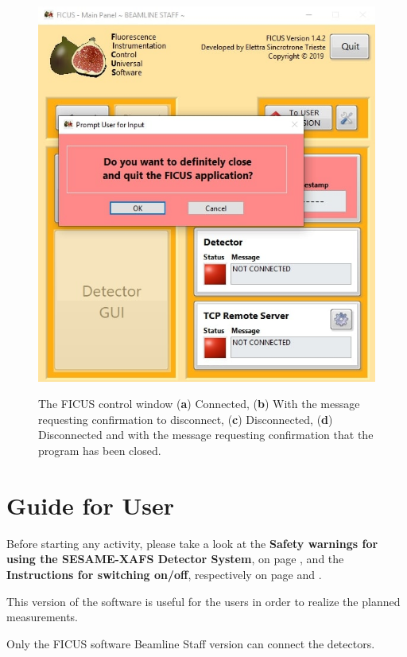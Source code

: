 \documentclass[a4paper,12pt,oneside,pdflatex,italian,final,twocolumn]{article}
\begin{document}
\begin{figure}[h]
\subfloat
{\includegraphics[width=.48\textwidth]{Cattura73.jpg}} \\
\caption{The FICUS control window (\textbf{a}) Connected, (\textbf{b}) With the message requesting confirmation to disconnect, (\textbf{c}) Disconnected, (\textbf{d}) Disconnected and with the message requesting confirmation that the program has been closed.}\label{fig:fig55}
\end{figure}
















\clearpage

\section{Guide for User}

Before starting any activity, please take a look at the \textbf{Safety warnings for using the SESAME-XAFS Detector System}, on page \pageref{accensione}, and the \textbf{Instructions for switching on/off}, respectively on page \pageref{accensione} and \pageref{spegnimento}.

This version of the software is useful for the users in order to realize the planned measurements.

Only the FICUS software Beamline Staff version can connect the detectors.
\end{document}
